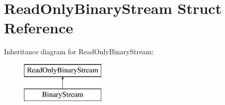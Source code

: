 \hypertarget{struct_read_only_binary_stream}{}\section{Read\+Only\+Binary\+Stream Struct Reference}
\label{struct_read_only_binary_stream}
Inheritance diagram for Read\+Only\+Binary\+Stream\+:\begin{figure}[H]
\begin{center}
\leavevmode
\includegraphics[height=2.000000cm]{struct_read_only_binary_stream}
\end{center}
\end{figure}
